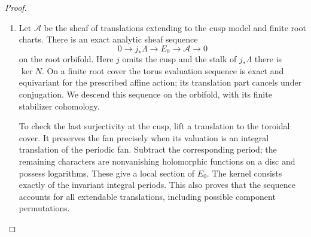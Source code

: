 \documentclass[11pt,a4paper]{article}
\numberwithin{equation}{section}
\theoremstyle{definition}
\begin{document}
\begin{proof}
\begin{enumerate}[label=\arabic*.]
\item Let $\mathcal A$ be the sheaf of translations extending to
the cusp model and finite root charts. There is
an exact analytic sheaf sequence
\[
0\to j_*\Lambda\to E_0\to\mathcal A\to0
\]
on the root orbifold. Here $j$ omits the cusp and the stalk
of $j_*\Lambda$ there is $\ker N$.
On a finite root cover the torus evaluation sequence is exact and
equivariant for the prescribed affine action; its translation part
cancels under conjugation.  We descend this sequence on the orbifold, with its finite stabilizer cohomology.

To check the last surjectivity at the cusp, lift a translation
to the toroidal cover. It preserves the fan precisely when
its valuation is an integral translation of the periodic
fan. Subtract the corresponding period; the remaining
characters are nonvanishing holomorphic functions on a
disc and possess logarithms. These give a local section
of $E_0$. The kernel consists exactly of the invariant
integral periods. This also proves that the sequence
accounts for all extendable translations, including
possible component permutations.


\end{enumerate}
\end{proof}
\end{document}
